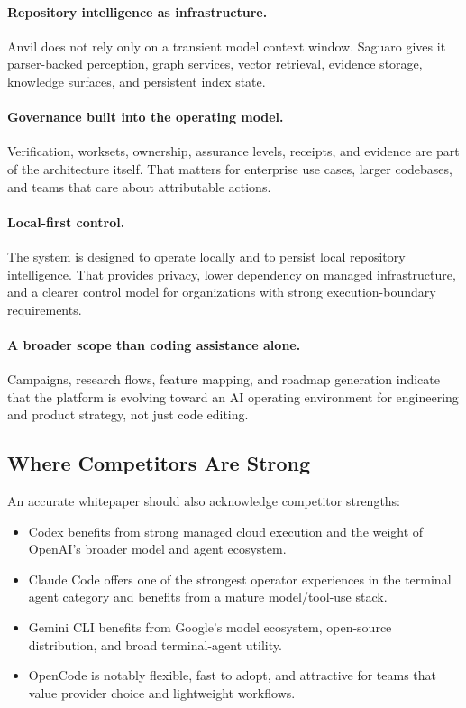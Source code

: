 \documentclass[11pt,a4paper]{article}
\begin{document}
\paragraph{Repository intelligence as infrastructure.}
Anvil does not rely only on a transient model context window. Saguaro gives it parser-backed perception, graph services, vector retrieval, evidence storage, knowledge surfaces, and persistent index state.

\paragraph{Governance built into the operating model.}
Verification, worksets, ownership, assurance levels, receipts, and evidence are part of the architecture itself. That matters for enterprise use cases, larger codebases, and teams that care about attributable actions.

\paragraph{Local-first control.}
The system is designed to operate locally and to persist local repository intelligence. That provides privacy, lower dependency on managed infrastructure, and a clearer control model for organizations with strong execution-boundary requirements.

\paragraph{A broader scope than coding assistance alone.}
Campaigns, research flows, feature mapping, and roadmap generation indicate that the platform is evolving toward an AI operating environment for engineering and product strategy, not just code editing.

\subsection{Where Competitors Are Strong}
An accurate whitepaper should also acknowledge competitor strengths:
\begin{itemize}
    \item Codex benefits from strong managed cloud execution and the weight of OpenAI's broader model and agent ecosystem.\cite{openai_codex_intro,openai_codex_docs}
    \item Claude Code offers one of the strongest operator experiences in the terminal agent category and benefits from a mature model/tool-use stack.\cite{anthropic_claude_code}
    \item Gemini CLI benefits from Google's model ecosystem, open-source distribution, and broad terminal-agent utility.\cite{google_gemini_cli}
    \item OpenCode is notably flexible, fast to adopt, and attractive for teams that value provider choice and lightweight workflows.\cite{opencode_docs}
\end{itemize}
\end{document}
